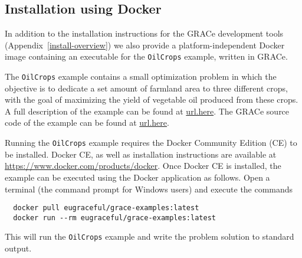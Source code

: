 

\subsection{Installation using Docker}
\label{install-docker}

In addition to the installation instructions for the GRACe development tools
(Appendix~\ref{install-overview}) we also provide a platform-independent Docker
image containing an executable for the \verb!OilCrops! example, written in
GRACe.

The \verb!OilCrops! example contains a small optimization problem in which the
objective is to dedicate a set amount of farmland area to three different crops,
with the goal of maximizing the yield of vegetable oil produced from these 
crops. A full description of the example can be found at \url{url.here}. 
The GRACe source code of the example can be found at \url{url.here}.

Running the \verb!OilCrops! example requires the Docker Community Edition (CE)
to be installed. Docker CE, as well as installation instructions are available
at \url{https://www.docker.com/products/docker}. Once Docker CE is installed,
the example can be executed using the Docker application as follows. Open a
terminal (the command prompt for Windows users) and execute the commands
%
\begin{verbatim}
  docker pull eugraceful/grace-examples:latest
  docker run --rm eugraceful/grace-examples:latest
\end{verbatim}

\noindent
This will run the \verb!OilCrops! example and write the problem solution to
standard output.

